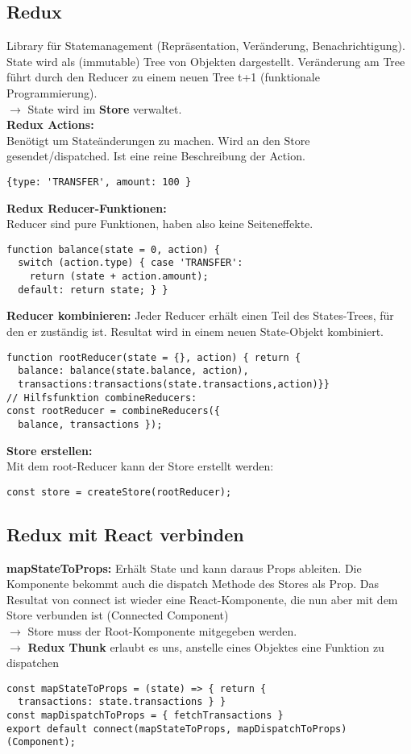 \subsection{Redux}
Library für Statemanagement (Repräsentation, Veränderung, Benachrichtigung). State wird als (immutable) Tree von Objekten dargestellt. Veränderung am Tree führt durch den Reducer zu einem neuen Tree t+1 (funktionale Programmierung).\\
$\rightarrow$ State wird im \textbf{Store} verwaltet.\\
\textcolor{b}{\textbf{Redux Actions:}}\\
Benötigt um Stateänderungen zu machen. Wird an den Store gesendet/dispatched. Ist eine reine Beschreibung der Action.
\begin{lstlisting}[style=htmlcssjs]
{type: 'TRANSFER', amount: 100 }
\end{lstlisting}
\textcolor{b}{\textbf{Redux Reducer-Funktionen:}}\\
Reducer sind pure Funktionen, haben also keine Seiteneffekte.
\begin{lstlisting}[style=htmlcssjs]
function balance(state = 0, action) {
  switch (action.type) { case 'TRANSFER':
    return (state + action.amount);
  default: return state; } }
\end{lstlisting}
\textbf{Reducer kombinieren:} Jeder Reducer erhält einen Teil des States-Trees, für den er zuständig ist. Resultat wird in einem neuen State-Objekt kombiniert.
\begin{lstlisting}[style=htmlcssjs]
function rootReducer(state = {}, action) { return {
  balance: balance(state.balance, action),
  transactions:transactions(state.transactions,action)}}
// Hilfsfunktion combineReducers:
const rootReducer = combineReducers({
  balance, transactions });
\end{lstlisting}
\textcolor{b}{\textbf{Store erstellen:}}\\
Mit dem root-Reducer kann der Store erstellt werden:
\begin{lstlisting}[style=htmlcssjs]
const store = createStore(rootReducer);
\end{lstlisting}
\subsection{Redux mit React verbinden}
\textcolor{b}{\textbf{mapStateToProps:}} Erhält State und kann daraus Props ableiten. Die Komponente bekommt auch die dispatch Methode des Stores als Prop. Das Resultat von connect ist wieder eine React-Komponente, die nun aber mit dem Store verbunden ist (Connected Component)\\
$\rightarrow$ Store muss der Root-Komponente mitgegeben werden.\\
$\rightarrow$ \textbf{Redux Thunk} erlaubt es uns, anstelle eines Objektes eine Funktion zu dispatchen
\begin{lstlisting}[style=htmlcssjs]
const mapStateToProps = (state) => { return {
  transactions: state.transactions } }
const mapDispatchToProps = { fetchTransactions }
export default connect(mapStateToProps, mapDispatchToProps)(Component);
\end{lstlisting}
